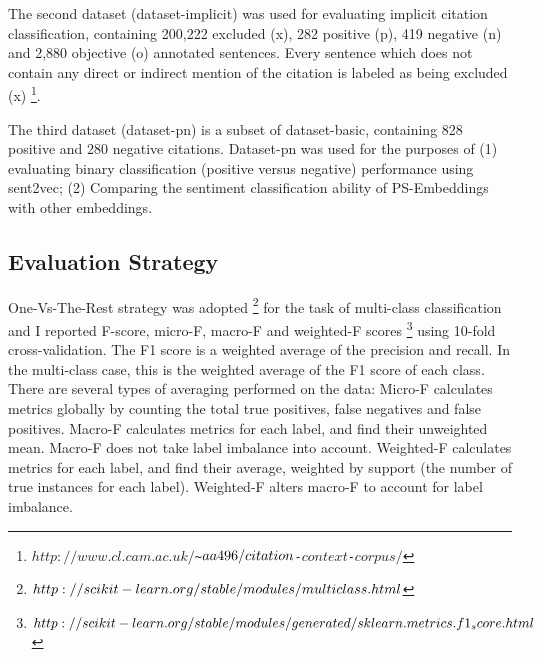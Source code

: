 \documentclass[11pt]{llncs}
\begin{document}
The second dataset (dataset-implicit) was used for evaluating implicit citation classification, containing 200,222 excluded (x), 282 positive (p), 419 negative (n) and 2,880 objective (o) annotated sentences. Every sentence which does not contain any direct or indirect mention of the citation is labeled as being excluded (x) \footnote{\footnotesize{\tt$http://www.cl.cam.ac.uk/$\textasciitilde$aa496\\/citation$-$context$-$corpus/$}}. %

The third dataset (dataset-pn) is a subset of dataset-basic, containing 828 positive and 280 negative citations. Dataset-pn was used for the purposes of (1) evaluating binary classification (positive versus negative) performance using sent2vec; (2) Comparing the sentiment classification ability of PS-Embeddings with other embeddings.  

\subsection{Evaluation Strategy}\label{sec:results}

One-Vs-The-Rest strategy was adopted \footnote{\footnotesize{\tt $http://scikit-learn.org/stable/\\modules/multiclass.html$}} for the task of multi-class classification and I reported F-score, micro-F, macro-F and weighted-F scores \footnote{\footnotesize{\tt $http://scikit-learn.org/stable/modules/\\generated/sklearn.metrics.f1_score.html$}} using 10-fold cross-validation. The F1 score is a weighted average of the precision and recall. In the multi-class case, this is the weighted average of the F1 score of each class. There are several types of averaging performed on the data: Micro-F calculates metrics globally by counting the total true positives, false negatives and false positives. Macro-F calculates metrics for each label, and find their unweighted mean. Macro-F does not take label imbalance into account. Weighted-F calculates metrics for each label, and find their average, weighted by support (the number of true instances for each label). Weighted-F alters macro-F to account for label imbalance. 
\end{document}
